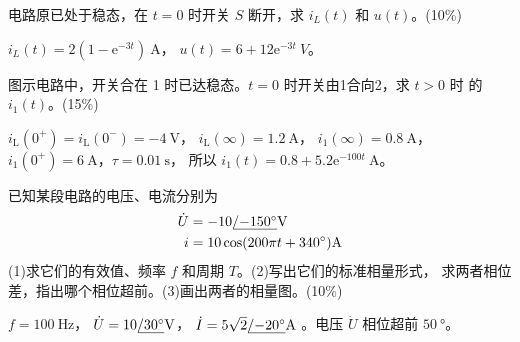 \documentclass[a4paper,12pt]{examdesign}
\def\Varangle#1{\kern.75pt\vtop{\hbox{\kern-.75pt$/{#1}$}\kern-.35pt\hrule}}
\begin{document}
\begin{shortanswer}[title={第一部分}]
\begin{question}
    电路原已处于稳态，在 $t=0$ 时开关 $S$ 断开，求 $i_L(t)$ 和
    $u(t)$。\hfill(10\%)
    \begin{figure}[H]
    \hfill
    
    \end{figure}
    \examvspace*{4cm}
    \begin{answer}
        $i_L(t)=2(1-\mathrm{e}^{-3t})\SI{}{\ampere}$，
        $u(t)=6+12\mathrm{e}^{-3t}\SI{}{V}$。
    \end{answer}
\end{question}

\begin{question}
    图示电路中，开关合在 1 时已达稳态。$t=0$ 时开关由1合向2，求 $t>0$ 时
    的 $i_1(t)$。\hfill(15\%)
    \begin{figure}[H]
    \hfill
    
    \end{figure}
    \examvspace*{14cm}
    \begin{answer}
        $i_\mathrm{L}(0^+) = i_\mathrm{L}(0^-) = \SI{-4}{\volt}$，
        $i_\mathrm{L}(\infty)=\SI{1.2}{\ampere}$，
        $i_1(\infty)=\SI{0.8}{\ampere}$，
        $i_1(0^+)=\SI{6}{\ampere}$，$\tau=\SI{0.01}{\second}$，
        所以 $i_1(t)=0.8+5.2\mathrm{e}^{-100t}\SI{}{\ampere}$。
    \end{answer}
\end{question}

\begin{question}
    已知某段电路的电压、电流分别为
    \begin{equation*}
        \begin{aligned}
            \dot{U} &= -10\Varangle{\SI{-150}{\degree}}\SI{}{\volt} \\
                  i &= 10\cos (200\pi t+\SI{340}{\degree})\SI{}{\ampere}
        \end{aligned}
    \end{equation*}
    (1)求它们的有效值、频率 $f$ 和周期 $T$。(2)写出它们的标准相量形式，
    求两者相位差，指出哪个相位超前。(3)画出两者的相量图。\hfill(10\%)
    \examvspace*{4cm}
    \begin{answer}
        $f=\SI{100}{\hertz}$，
        $\dot{U}=10\Varangle{\SI{30}{\degree}}\SI{}{\volt}$，
        $\dot{I}=5\sqrt{2}\Varangle{\SI{-20}{\degree}}\SI{}{\ampere}$
        。电压 $\dot{U}$ 相位超前 $\SI{50}{\degree}$。
    \end{answer}
\end{question}


\end{shortanswer}
\end{document}
